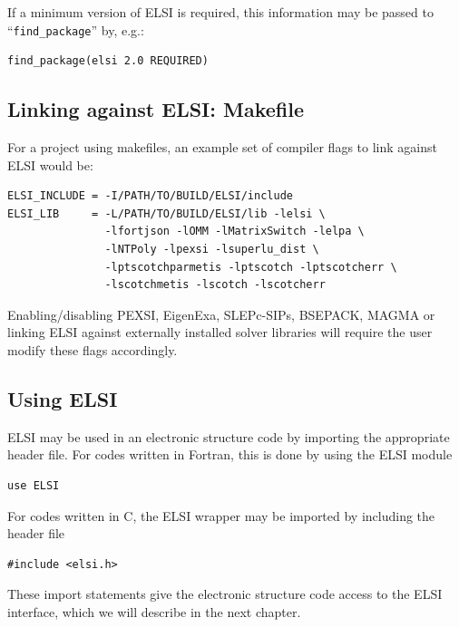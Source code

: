 \documentclass{report}
\begin{document}
If a minimum version of ELSI is required, this information may be passed to ``\verb+find_package+'' by, e.g.:
\begin{tcolorbox}
\begin{verbatim}
find_package(elsi 2.0 REQUIRED)
\end{verbatim}
\end{tcolorbox}

\subsection{Linking against ELSI: Makefile}
\label{subsec:import_makefile}
For a project using makefiles, an example set of compiler flags to link against ELSI would be:
\begin{tcolorbox}
\begin{verbatim}
ELSI_INCLUDE = -I/PATH/TO/BUILD/ELSI/include
ELSI_LIB     = -L/PATH/TO/BUILD/ELSI/lib -lelsi \
               -lfortjson -lOMM -lMatrixSwitch -lelpa \
               -lNTPoly -lpexsi -lsuperlu_dist \
               -lptscotchparmetis -lptscotch -lptscotcherr \
               -lscotchmetis -lscotch -lscotcherr
\end{verbatim}
\end{tcolorbox}

Enabling/disabling PEXSI, EigenExa, SLEPc-SIPs, BSEPACK, MAGMA or linking ELSI against externally installed solver libraries will require the user modify these flags accordingly.

\subsection{Using ELSI}
\label{subsec:import_use}
ELSI may be used in an electronic structure code by importing the appropriate header file. For codes written in Fortran, this is done by using the ELSI module
\begin{tcolorbox}
\begin{verbatim}
use ELSI
\end{verbatim}
\end{tcolorbox}

For codes written in C, the ELSI wrapper may be imported by including the header file
\begin{tcolorbox}
\begin{verbatim}
#include <elsi.h>
\end{verbatim}
\end{tcolorbox}

These import statements give the electronic structure code access to the ELSI interface, which we will describe in the next chapter.
\end{document}
